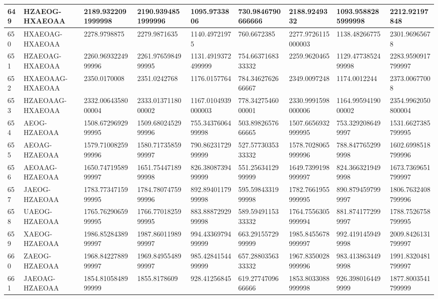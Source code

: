 {\begin{longtable}{|l|l|l|l|l|l|l|l|l|}
        649 & HZAEOG-HXAEOAA & 2189.9322091999998 & 2190.9394851999996 & 1095.9733806 & 730.9846790666666 & 2188.9249332 & 1093.9588285999998 & 2212.92197848 \\ \hline
        650 & HXAEOAG-HXAEOAA & 2278.9798875 & 2279.9871635 & 1140.49721975 & 760.6672385 & 2277.9726115000003 & 1138.48266775 & 2301.96965678 \\ \hline
        651 & HZAEOAG-HXAEOAA & 2260.9693224999996 & 2261.9765984999995 & 1131.4919372499999 & 754.6637168333332 & 2259.9620465 & 1129.4773852499998 & 2283.9590917799997 \\ \hline
        652 & HXAEOAAG-HXAEOAA & 2350.0170008 & 2351.0242768 & 1176.0157764 & 784.3462762666667 & 2349.0097248 & 1174.0012244 & 2373.00677008 \\ \hline
        653 & HZAEOAAG-HXAEOAA & 2332.0064358000004 & 2333.0137118000002 & 1167.0104939000003 & 778.3427546000001 & 2330.9991598000006 & 1164.9959419000002 & 2354.9962050800004 \\ \hline
        654 & AEOG-HZAEOAA & 1508.6729692999995 & 1509.6802452999996 & 755.3437606499998 & 503.8982657666665 & 1507.6656932999995 & 753.3292086499997 & 1531.6627385799995 \\ \hline
        655 & AEOAG-HZAEOAA & 1579.7100825999996 & 1580.7173585999997 & 790.8623172999999 & 527.5773035333332 & 1578.7028065999996 & 788.8477652999998 & 1602.6998518799996 \\ \hline
        656 & AEOAAG-HZAEOAA & 1650.7471958999997 & 1651.7544718999998 & 826.3808739499999 & 551.2563412999999 & 1649.7399198999997 & 824.3663219499998 & 1673.7369651799997 \\ \hline
        657 & JAEOG-HZAEOAA & 1783.7734715999995 & 1784.7807475999996 & 892.8940117999998 & 595.5984331999998 & 1782.7661955999995 & 890.8794597999997 & 1806.7632408799996 \\ \hline
        658 & UAEOG-HZAEOAA & 1765.7629065999995 & 1766.7701825999995 & 883.8887292999998 & 589.5949115333332 & 1764.7556305999994 & 881.8741772999997 & 1788.7526758799995 \\ \hline
        659 & XAEOG-HZAEOAA & 1986.8528438999997 & 1987.8601198999997 & 994.4336979499999 & 663.2915572999999 & 1985.8455678999997 & 992.4191459499998 & 2009.8426131799997 \\ \hline
        660 & ZAEOG-HZAEOAA & 1968.8422788999997 & 1969.8495548999997 & 985.4284154499999 & 657.2880356333332 & 1967.8350028999996 & 983.4138634499998 & 1991.8320481799997 \\ \hline
        661 & JAEOAG-HZAEOAA & 1854.8105848999999 & 1855.8178609 & 928.41256845 & 619.2774709666666 & 1853.8033088999998 & 926.3980164499999 & 1877.8003541799999 \\ \hline

\end{longtable}}
